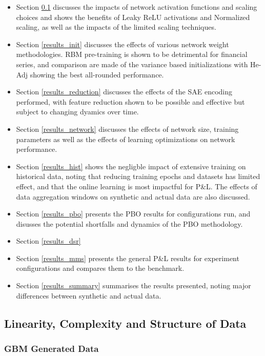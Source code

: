 \documentclass[a4paper,11pt,oneside]{article}
\theoremstyle{plain}
\theoremstyle{definition}
\begin{document}
\begin{itemize}
	\item[1] Section \ref{results_linearity} discusses the impacts of network activation functions and scaling choices and shows the benefits of Leaky ReLU activations and Normalized scaling, as well as the impacts of the limited scaling techniques.
	\item[2] Section \ref{results_init} discusses the effects of various network weight methodologies. RBM pre-training is shown to be detrimental for financial series, and comparison are made of the variance based initializations with He-Adj showing the best all-rounded performance.
	\item[3] Section \ref{results_reduction} discusses the effects of the SAE encoding performed, with feature reduction shown to be possible and effective but subject to changing dyamics over time.
	\item[4] Section \ref{results_network} discusses the effects of network size, training parameters as well as the effects of learning optimizations on network performance.
	\item[5] Section \ref{results_hist} shows the negligble impact of extensive training on historical data, noting that reducing training epochs and datasets has limited effect, and that the online learning is most impactful for P\&L. The effects of data aggregation windows on synthetic and actual data are also discussed.
	\item[6] Section \ref{results_pbo} presents the PBO results for configurations run, and disusses the potential shortfalls and dynamics of the PBO methodology.
	\item[7] Section \ref{results_dsr} 
	\item[8] Section \ref{results_mms} presents the general P\&L results for experiment configurations and compares them to the benchmark.
	\item[9] Section \ref{results_summary} summarises the results presented, noting major differences between synthetic and actual data.
\end{itemize}

\newpage
\subsection{Linearity, Complexity and Structure of Data}\label{results_linearity}

\subsubsection{GBM Generated Data}\label{results_gbm_data}
\end{document}
